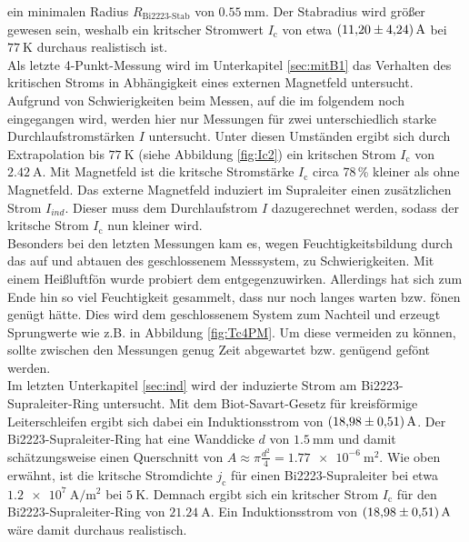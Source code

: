 \noindent
ein minimalen Radius $R_{\text{Bi2223-Stab}}$ von $\SI{0.55}{\milli\meter}$.
Der Stabradius wird größer gewesen sein, weshalb ein kritscher Stromwert
$I_{\text{c}}$ von etwa $\SI{11.2\pm4,24}{\ampere}$ bei $\SI{77}{\kelvin}$ durchaus
realistisch ist.\\
Als letzte 4-Punkt-Messung wird im Unterkapitel \ref{sec:mitB1} das Verhalten des
kritischen Stroms in Abhängigkeit eines externen Magnetfeld untersucht.
Aufgrund von Schwierigkeiten beim Messen, auf die im folgendem noch eingegangen wird,
werden hier nur Messungen für zwei unterschiedlich starke Durchlaufstromstärken $I$
untersucht. Unter diesen Umständen ergibt sich durch Extrapolation bis $\SI{77}{\kelvin}$
(siehe Abbildung \ref{fig:Ic2}) ein kritschen Strom $I_{\text{c}}$ von $\SI{2,42}{\ampere}$.
Mit Magnetfeld ist die kritsche Stromstärke $I_{\text{c}}$ circa 78$\,$\% kleiner
als ohne Magnetfeld. Das externe Magnetfeld induziert im Supraleiter einen
zusätzlichen Strom $I_{ind}$. Dieser muss dem Durchlaufstrom $I$ dazugerechnet werden,
sodass der kritsche Strom $I_{\text{c}}$ nun kleiner wird.\\
Besonders bei den letzten Messungen kam es, wegen Feuchtigkeitsbildung durch das
auf und abtauen des geschlossenem Messsystem, zu Schwierigkeiten. Mit einem Heißluftfön
wurde probiert dem entgegenzuwirken. Allerdings hat sich zum Ende hin so viel
Feuchtigkeit gesammelt, dass nur noch langes warten bzw. fönen genügt hätte. Dies
wird dem geschlossenem System zum Nachteil und erzeugt Sprungwerte wie z.B. in
Abbildung \ref{fig:Tc4PM}. Um diese vermeiden zu können, sollte zwischen den
Messungen genug Zeit abgewartet bzw. genügend gefönt werden.\\
Im letzten Unterkapitel \ref{sec:ind} wird der induzierte Strom am Bi2223-Supraleiter-Ring
untersucht. Mit dem Biot-Savart-Gesetz für kreisförmige Leiterschleifen ergibt
sich dabei ein Induktionsstrom von $\SI{18,98\pm0.51}{\ampere}$. Der Bi2223-Supraleiter-Ring
hat eine Wanddicke $d$ von $\SI{1,5}{\milli\meter}$ und damit schätzungsweise einen
Querschnitt von $A \approx \pi \frac{d^2}{4} = \SI{1,77e-6}{\meter\squared}$.
Wie oben erwähnt, ist die kritsche Stromdichte $j_{\text{c}}$ für einen Bi2223-Supraleiter
bei etwa $\SI{1.2e7}{\ampere\per\metre\squared}$ bei $\SI{5}{\kelvin}$. Demnach
ergibt sich ein kritscher Strom $I_{\text{c}}$ für den Bi2223-Supraleiter-Ring
von $\SI{21,24}{\ampere}$. Ein Induktionsstrom von $\SI{18,98\pm0,51}{\ampere}$
wäre damit durchaus realistisch.
